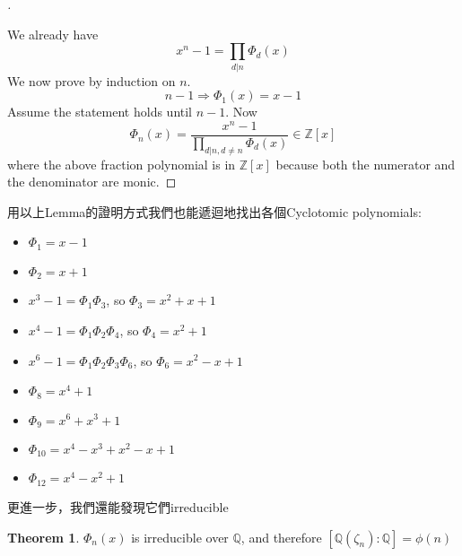 \documentclass[12pt]{article}
\theoremstyle{definition}
\newtheorem{thm}{Theorem}
\newenvironment{proofs}[1][\proofname]{%
  \begin{proof}[#1]$ $\par\nobreak\ignorespaces
}{%
  \end{proof}
}
\newcommand{\QQ}{\mathbb Q}
\begin{document}
\begin{proofs}
	We already have
	\[
		x^n - 1 = \prod_{d | n} \Phi_d(x)
	\]
	We now prove by induction on $n$.
	\[
		n - 1 \Rightarrow \Phi_1(x) = x- 1
	\]
	Assume the statement holds until $n - 1$.
	Now
	\[
		\Phi_n(x) = \frac{x^n - 1}{\prod_{d|n, d \neq n} \Phi_d(x)} \in \mathbb{Z}[x]
	\]
	where the above fraction polynomial is in $\mathbb{Z}[x]$ because both the numerator and the denominator are monic.
\end{proofs}

用以上Lemma的證明方式我們也能遞迴地找出各個Cyclotomic polynomials:
\begin{itemize}
	\item $\Phi_1=x-1$
	\item $\Phi_2=x+1$
	\item $x^3-1=\Phi_1\Phi_3$, so $\Phi_3=x^2+x+1$
	\item $x^4-1=\Phi_1\Phi_2\Phi_4$, so $\Phi_4=x^2+1$
	\item $x^6-1=\Phi_1\Phi_2\Phi_3\Phi_6$, so $\Phi_6=x^2-x+1$
	\item $\Phi_8=x^4+1$
	\item $\Phi_9=x^6+x^3+1$
	\item $\Phi_{10}=x^4-x^3+x^2-x+1$
	\item $\Phi_{12}=x^4-x^2+1$
\end{itemize}

更進一步，我們還能發現它們irreducible

\begin{thm}
	$\Phi_n(x)$ is irreducible over $\mathbb{Q}$, and therefore $[\QQ(\zeta_n):\QQ]=\phi(n)$
\end{thm}
\end{document}
